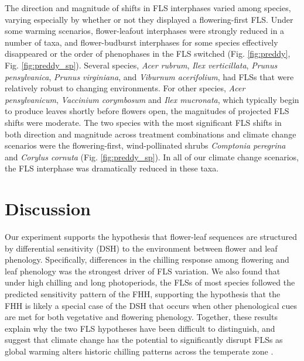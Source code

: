 \documentclass[12pt]{article}\usepackage[]{graphicx}\usepackage[]{color}
\begin{document}
\noindent The direction and magnitude of shifts in FLS interphases varied among species, varying especially by whether or not they displayed a flowering-first FLS. Under some warming scenarios, flower-leafout interphases were strongly reduced in a number of taxa, and flower-budburst interphases for some species effectively disappeared or the order of phenophases in the FLS switched (Fig. \ref{fig:preddy}, Fig. \ref{fig:preddy_sp}). Several species, \textit{Acer rubrum}, \textit{Ilex verticillata}, \textit{Prunus pensylvanica}, \textit{Prunus virginiana}, and \textit{Viburnum acerifolium}, had FLSs that were relatively robust to changing environments. For other species, \textit{Acer pensylvanicum}, \textit{Vaccinium corymbosum} and \textit{Ilex mucronata}, which typically begin to produce leaves shortly before flowers open, the magnitudes of projected FLS shifts were moderate. The two species with the most significant FLS shifts in both direction and magnitude across treatment combinations and climate change scenarios were the flowering-first, wind-pollinated shrubs \textit{Comptonia peregrina} and \textit{Corylus cornuta} (Fig. \ref{fig:preddy_sp}). In all of our climate change scenarios, the FLS interphase was dramatically reduced in these taxa.\\

\section*{Discussion}
\noindent Our experiment supports the hypothesis that flower-leaf sequences are structured by differential sensitivity (DSH) to the environment between flower and leaf phenology. Specifically, differences in the chilling response among flowering and leaf phenology was the strongest driver of FLS variation. We also found that under high chilling and long photoperiods, the FLSs of most species followed the predicted sensitivity pattern of the FHH, supporting the hypothesis that the FHH is likely a special case of the DSH that occurs when other phenological cues are met for both vegetative and flowering phenology. Together, these results explain why the two FLS hypotheses have been difficult to distinguish, and suggest that climate change has the potential to significantly disrupt FLSs as global warming alters historic chilling patterns across the temperate zone \citep{Morin:2009aa}. 
\end{document}
